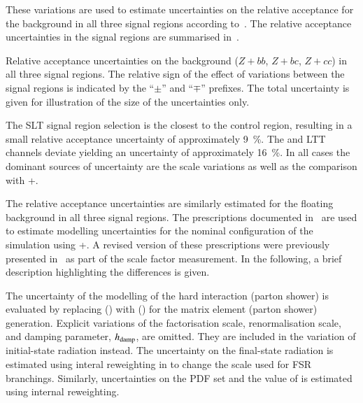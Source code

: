 These variations are used to estimate uncertainties on the relative
acceptance for the \ZHF background in all
three signal regions according
to~. The relative acceptance
uncertainties in the signal regions are summarised
in~.

\begin{table}[htbp]
  \centering

  

  \caption{Relative acceptance uncertainties on the \ZHF background
    ($Z+bb$, $Z+bc$, $Z+cc$) in all three signal regions. The relative
    sign of the effect of variations between the signal regions is
    indicated by the ``$\pm$'' and ``$\mp$'' prefixes. The total
    uncertainty is given for illustration of the size of the
    uncertainties only.}
  \label{tab:uncertainties_zhf_extrapol}
\end{table}

The \lephad SLT signal region selection is the closest to the \ZHF
control region, resulting in a small relative acceptance uncertainty
of approximately \SI{9}{\percent}. The \hadhad and \lephad LTT
channels deviate yielding an uncertainty of approximately
\SI{16}{\percent}. In all cases the dominant sources of uncertainty
are the scale variations as well as the comparison with
\MGNLO+\PYTHIA[8].

The relative acceptance uncertainties are similarly estimated for the
floating \ttbar background in all three signal regions. The
prescriptions documented in~\cite{ATL-PHYS-PUB-2020-023} are used to
estimate modelling uncertainties for the nominal configuration of the
\ttbar simulation using \POWHEGBOX[v2]+\PYTHIA[8]. A revised version
of these prescriptions were previously presented
in~ as part of the \ttbarFakes scale
factor measurement. In the following, a brief description highlighting
the differences is given.

The uncertainty of the modelling of the hard interaction (parton
shower) is evaluated by replacing \POWHEGBOX[v2] (\PYTHIA[8]) with
\MGNLO (\HERWIG[7]) for the matrix element (parton shower)
generation. Explicit variations of the factorisation scale,
renormalisation scale, and \PYTHIA[8] damping parameter, $h_\mathrm{damp}$, are
omitted. They are included in the variation of initial-state radiation
instead. The uncertainty on the final-state radiation is estimated
using interal reweighting in \PYTHIA[8] to change the scale used for
FSR branchings. Similarly, uncertainties on the PDF set and the value
of \alphas is estimated using internal reweighting.

